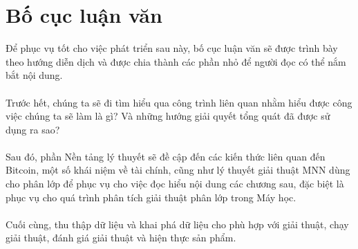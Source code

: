 \section{Bố cục luận văn}
Để phục vụ tốt cho việc phát triển sau này, bố cục luận văn sẽ được trình bày 
theo hướng diễn dịch và được chia thành các phần nhỏ để người đọc có thể nắm 
bắt nội dung.\\\\
Trước hết, chúng ta sẽ đi tìm hiểu qua công trình liên quan nhằm hiểu được công việc 
chúng ta sẽ làm là gì? Và những hướng giải quyết tổng quát đã được sử dụng ra 
sao?\\\\
Sau đó, phần Nền tảng lý thuyết sẽ đề cập đến các kiến thức liên quan đến Bitcoin, một số 
khái niệm về tài chính, cũng như lý thuyết giải thuật MNN dùng cho phân lớp để 
phục vụ cho việc đọc hiểu nội dung các chương sau, đặc biệt là phục vụ cho quá 
trình phân tích giải thuật phân lớp trong Máy học.\\\\
Cuối cùng, thu thập dữ liệu và khai phá dữ liệu cho phù hợp với giải thuật, 
chạy giải thuật, đánh giá giải thuật và hiện thực sản phẩm.

